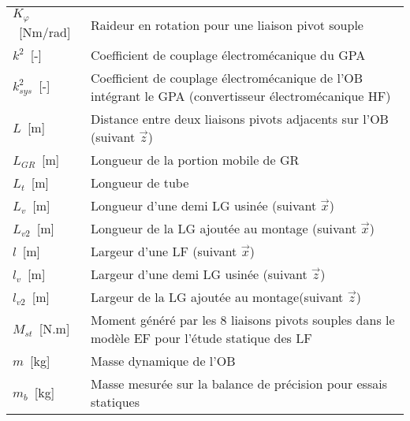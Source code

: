 \begin{table}
{\begin{tabular}{l m{12cm}}
$K_{\varphi}$~[Nm/rad]& Raideur en rotation pour une liaison pivot souple   \\
$k^2$~[-]      & Coefficient de couplage électromécanique du GPA \\
$k^2_{sys}$~[-]& Coefficient de couplage électromécanique de l'OB intégrant le GPA (convertisseur électromécanique HF) \\  \cline{1-1}
$L$~[m]    & Distance entre deux liaisons pivots adjacents sur l'OB (suivant $\vec{z}$) \\
$L_{GR}$~[m]    & Longueur de la portion mobile de GR \\
$L_t$~[m]       & Longueur de tube \\
$L_{v}$~[m]     & Longueur d'une demi LG usinée (suivant $\vec{x}$) \\
$L_{v2}$~[m]    & Longueur de la LG ajoutée au montage (suivant $\vec{x}$) \\
$l$~[m]         & Largeur d'une LF (suivant $\vec{x}$) \\
$l_{v}$~[m]     & Largeur d'une demi LG usinée (suivant $\vec{z}$) \\
$l_{v2}$~[m]    & Largeur de la LG ajoutée au montage(suivant $\vec{z}$) \\  \cline{1-1}
$M_{st}$~[N.m]        & Moment généré par les 8 liaisons pivots souples dans le modèle EF pour l'étude statique des LF\\
$m$~[kg]          & Masse dynamique de l'OB  \\
$m_b$~[kg]         & Masse mesurée sur la balance de précision pour essais statiques  \\
            \end{tabular}}
\end{table}

